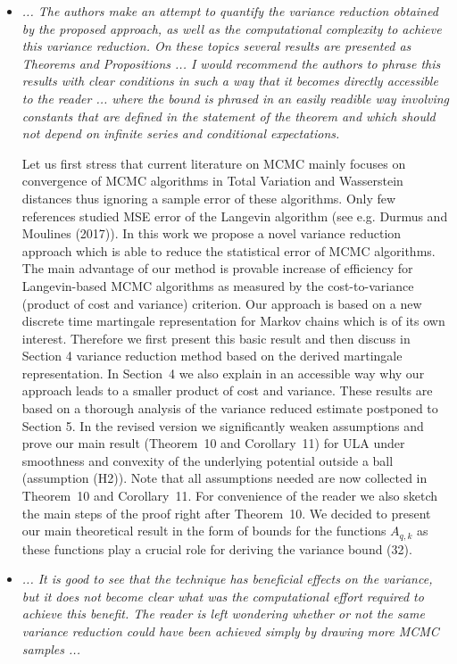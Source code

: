 \documentclass{article}%
\begin{document}
\begin{itemize}

\item \textit{... The authors make an attempt to quantify the variance reduction obtained by the proposed approach, as well as the computational complexity to achieve this variance reduction. On these topics several results are presented as Theorems and Propositions  ... I would recommend the authors to phrase this results with clear conditions in such a way that it becomes directly accessible to the reader ... where the bound is phrased in an easily readible way involving constants that are defined in the statement of the theorem and which should not depend on infinite series and conditional expectations.}
\par
Let us first stress that  current literature on MCMC  mainly focuses on  convergence of MCMC algorithms in Total Variation and Wasserstein distances thus  ignoring a sample error of these algorithms. Only few references studied MSE error of the Langevin algorithm (see e.g.  Durmus and  Moulines (2017)). In this work we propose a novel variance reduction approach which is able to reduce the statistical error of MCMC algorithms. The main advantage of our method is provable increase of efficiency for Langevin-based MCMC algorithms as measured by  the cost-to-variance (product of cost and variance) criterion. Our approach is based on a new discrete time martingale representation for Markov chains which is of its own interest. Therefore we first present this basic result and then discuss in Section 4 variance reduction method based on the derived martingale representation. In  Section~4 we  also explain in an accessible way why our approach leads to  a smaller product of cost and variance. These results are based on a thorough analysis of the variance reduced estimate postponed to Section 5. In the revised version we significantly weaken  assumptions  and prove our main result (Theorem~10 and Corollary~11) for ULA under smoothness  and convexity of the underlying potential outside a ball (assumption  (H2)).   Note that all assumptions needed are now collected in Theorem~10 and Corollary~11. For convenience of the reader we also sketch the main steps of the proof right after 
Theorem~10. We decided to present our main theoretical result in the form of bounds for the functions $A_{q,k}$ as these functions play a crucial role for deriving  the variance bound (32). 
\item \textit{... It is good to see that the technique has beneficial effects on the variance, but it does not become clear what was the computational effort required to achieve this benefit. The reader is left wondering whether or not the same variance reduction could have been achieved simply by drawing more MCMC samples ...}

\end{itemize}
\end{document}
